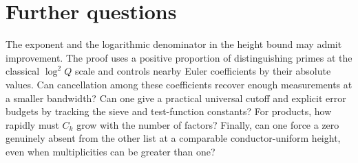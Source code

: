 \documentclass[11pt,letterpaper]{article}
\begin{document}
\section{Further questions}
The exponent and the logarithmic denominator in the height bound may admit improvement. The proof uses a positive proportion of distinguishing primes at the classical $\log^2 Q$ scale and controls nearby Euler coefficients by their absolute values. Can cancellation among these coefficients recover enough measurements at a smaller bandwidth? Can one give a practical universal cutoff and explicit error budgets by tracking the sieve and test-function constants? For products, how rapidly must $C_k$ grow with the number of factors? Finally, can one force a zero genuinely absent from the other list at a comparable conductor-uniform height, even when multiplicities can be greater than one?
\end{document}
